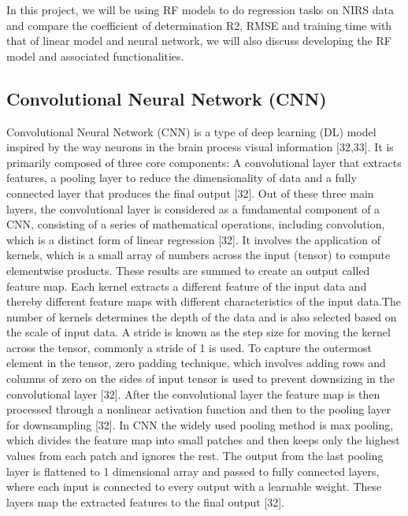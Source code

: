 \documentclass[12pt,a4paper]{report}
\begin{document}
In this project, we will be using RF models to do regression tasks on NIRS data and compare the coefficient of determination R2, RMSE and training time with that of linear model and neural network, we will also discuss developing the RF model and associated functionalities. \\



\subsection{Convolutional Neural Network (CNN)}

Convolutional Neural Network (CNN) is a type of deep learning (DL) model inspired by the way neurons in the brain process visual information [32,33]. It is primarily composed of three core components: A convolutional layer that extracts features, a pooling layer to reduce the 
dimensionality of data and a fully connected layer that produces the final output [32]. Out of these three main layers, the convolutional layer is considered as a fundamental component of a CNN, consisting of a series of mathematical operations, including convolution, which is 
a distinct form of linear regression [32]. It involves the application of kernels, which is a small array of numbers across the input (tensor) to compute elementwise products. These results are summed to create an output called feature map. Each kernel extracts a different feature 
of the input data and thereby different feature maps with different characteristics of the input data.The number of kernels determines the depth of the data and is also selected based on the scale of input data. A stride is known as the step size for moving the kernel across the tensor, 
commonly a stride of 1 is used. To capture the outermost element in the tensor, zero padding technique, which involves adding rows and columns of zero on the sides of input tensor is used to prevent downsizing in the convolutional layer [32]. After the convolutional layer the feature map 
is then processed through a nonlinear activation function and then to the pooling layer for downsampling [32]. In CNN the widely used pooling method is max pooling, which divides the feature map into small patches and then keeps only the highest values from each patch and ignores the rest. 
The output from the last pooling layer is flattened to 1 dimensional array and passed to fully connected layers, where each input is connected to every output with a learnable weight. These layers map the extracted features to the final output [32]. \\
\end{document}
